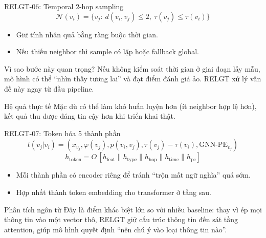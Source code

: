 \documentclass[aspectratio=169,11pt]{beamer}
\begin{document}
\begin{frame}{RELGT-06: Temporal 2-hop sampling}
  \[
    \mathcal{N}(v_i)=\{v_j:\ d(v_i,v_j)\le2,\ \tau(v_j)\le\tau(v_i)\}
  \]
  \begin{itemize}
    \item Giữ tính nhân quả bằng ràng buộc thời gian.
    \item Nếu thiếu neighbor thì sample có lặp hoặc fallback global.
  \end{itemize}
\begin{block}{Vì sao bước này quan trọng?}
  Nếu không kiểm soát thời gian ở giai đoạn lấy mẫu, mô hình có thể “nhìn thấy tương lai” và đạt điểm đánh giá ảo. RELGT xử lý vấn đề này ngay từ đầu pipeline.
\end{block}
\begin{exampleblock}{Hệ quả thực tế}
  Mặc dù có thể làm khó huấn luyện hơn (ít neighbor hợp lệ hơn), kết quả thu được đáng tin cậy hơn khi triển khai thật.
\end{exampleblock}
\end{frame}

\begin{frame}{RELGT-07: Token hóa 5 thành phần}
  \[
    t(v_j|v_i)=\left(x_{v_j},\varphi(v_j),p(v_i,v_j),\tau(v_j)-\tau(v_i),\text{GNN-PE}_{v_j}\right)
  \]
  \[
    h_\text{token}=O\,[h_\text{feat}\|h_\text{type}\|h_\text{hop}\|h_\text{time}\|h_\text{pe}]
  \]
  \begin{itemize}
    \item Mỗi thành phần có encoder riêng để tránh “trộn mất ngữ nghĩa” quá sớm.
    \item Hợp nhất thành token embedding cho transformer ở tầng sau.
  \end{itemize}
\begin{block}{Phân tích ngôn từ}
  Đây là điểm khác biệt lớn so với nhiều baseline: thay vì ép mọi thông tin vào một vector thô, RELGT giữ cấu trúc thông tin đến sát tầng attention, giúp mô hình quyết định “nên chú ý vào loại thông tin nào”.
\end{block}
\end{frame}
\end{document}
